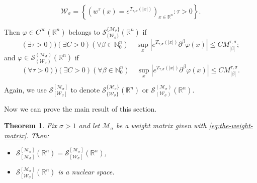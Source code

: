 \documentclass{article}
\theoremstyle{thmstyleone}
\newtheorem{Theorem}{Theorem}[section]%
\theoremstyle{thmstyletwo}%
\theoremstyle{thmstylethree}%
\begin{document}
\begin{equation}
\mathcal{W}_{\sigma}=\left\{\left(w^{\tau}(x)=e^{T_{\tau,\sigma}(|x|)}\right)_{x\in \mathbb{R}^n}\colon \tau>0\right\}.
\end{equation} 

Then $\varphi\in C^\infty (\mathbb R^n) $ belongs to
$ \mathcal S_{\{\mathcal{W}_\sigma \}}^{\{\mathcal{M}_\sigma \}} (\mathbb R^n) 
$
if
\begin{equation}
\label{DefinicijaWeightNiz}
 (\exists \tau>0)) (\exists C>0)(\forall \beta\in\mathbb N_0^n) 
\quad   \sup_{x}\left| e^{T_{\tau,\sigma}(|x|)} \partial^\beta \varphi(x)\right|\leq C
     M^{\tau,\sigma}_{|\beta|};
\end{equation}
and $\displaystyle \varphi\in \mathcal S_{(\mathcal{W}_\sigma)}^{(\mathcal{M}_\sigma)} (\mathbb R^n) 
$ if 
\begin{equation}
\label{DefinicijaWeightNiz-2}
 (\forall \tau>0)) (\exists C>0)(\forall \beta\in\mathbb N_0^n) 
\quad
   \sup_{x}\left| e^{T_{\tau,\sigma}(|x|)} \partial^\beta \varphi(x)\right|\leq C
     M^{\tau,\sigma}_{|\beta|}.
\end{equation}   

Again, we use 
$\mathcal S_{[\mathcal{W}_\sigma ] }^{ [\mathcal{M}_\sigma]}$ to denote $ \mathcal S_{\{\mathcal{W}_\sigma \}}^{\{\mathcal{M}_\sigma \}} (\mathbb R^n) 
$ 
or
$\mathcal S_{(\mathcal{W}_\sigma)}^{(\mathcal{M}_\sigma)} (\mathbb R^n). 
$


Now we can prove the main result of this section.

\begin{Theorem}
Fix $\sigma>1$ and let $\mathcal{M}_\sigma$ be a weight matrix given with \eqref{eq:the-weight-matrix}. Then: 
\begin{itemize}
\item[1.] $\mathcal S_{[\mathcal{M}_\sigma ] }^{ [\mathcal{M}_\sigma]} (\mathbb R^n)=\mathcal S_{[\mathcal{W}_\sigma ] }^{ [\mathcal{M}_\sigma]} (\mathbb R^n)$,
\item[2.]  $\mathcal S_{[\mathcal{W}_\sigma ] }^{ [\mathcal{M}_\sigma]} (\mathbb R^n)$ is a nuclear space.
\end{itemize}


\end{Theorem}
\end{document}
